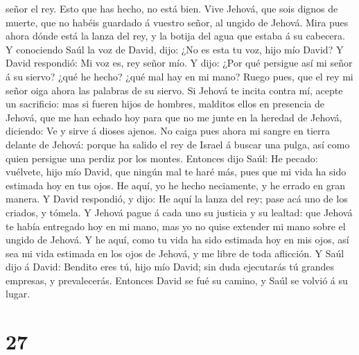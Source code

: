 señor el rey.  Esto que has hecho, no está bien. Vive
Jehová, que sois dignos de muerte, que no habéis guardado á vuestro
señor, al ungido de Jehová. Mira pues ahora dónde está la lanza del rey,
y la botija del agua que estaba á su cabecera.  Y
conociendo Saúl la voz de David, dijo: ¿No es esta tu voz, hijo mío
David? Y David respondió: Mi voz es, rey señor mío.  Y
dijo: ¿Por qué persigue así mi señor á su siervo? ¿qué he hecho? ¿qué
mal hay en mi mano?  Ruego pues, que el rey mi señor oiga
ahora las palabras de su siervo. Si Jehová te incita contra mí, acepte
un sacrificio: mas si fueren hijos de hombres, malditos ellos en
presencia de Jehová, que me han echado hoy para que no me junte en la
heredad de Jehová, diciendo: Ve y sirve á dioses ajenos. 
No caiga pues ahora mi sangre en tierra delante de Jehová: porque ha
salido el rey de Israel á buscar una pulga, así como quien persigue una
perdiz por los montes.  Entonces dijo Saúl: He pecado:
vuélvete, hijo mío David, que ningún mal te haré más, pues que mi vida
ha sido estimada hoy en tus ojos. He aquí, yo he hecho neciamente, y he
errado en gran manera.  Y David respondió, y dijo: He
aquí la lanza del rey; pase acá uno de los criados, y tómela.
 Y Jehová pague á cada uno su justicia y su lealtad: que
Jehová te había entregado hoy en mi mano, mas yo no quise extender mi
mano sobre el ungido de Jehová.  Y he aquí, como tu vida
ha sido estimada hoy en mis ojos, así sea mi vida estimada en los ojos
de Jehová, y me libre de toda aflicción.  Y Saúl dijo á
David: Bendito eres tú, hijo mío David; sin duda ejecutarás tú grandes
empresas, y prevalecerás. Entonces David se fué su camino, y Saúl se
volvió á su lugar.

\hypertarget{section-26}{%
\section{27}\label{section-26}}

